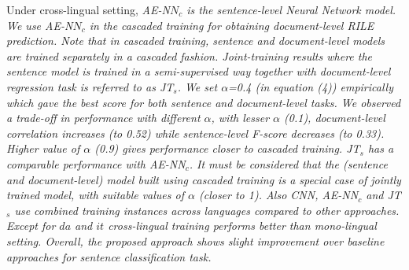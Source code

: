\documentclass[11pt,a4paper]{article}
\begin{document}
Under cross-lingual setting, \em{AE-N$N_{c}$} \rm is the sentence-level Neural Network model. We use \em{AE-N$N_{c}$} \rm in the \textit{cascaded training} for obtaining document-level RILE prediction. Note that in \textit{cascaded training}, sentence and document-level models are trained separately in a cascaded fashion. Joint-training results where the sentence model is trained in a semi-supervised way together with document-level regression task is referred to as \em{JT$_{s}$}\rm. We set  $\alpha$=0.4 (in equation (4)) empirically which gave the best score for both sentence and document-level tasks. We observed a trade-off in performance with different $\alpha$, with lesser $\alpha$ (0.1), document-level correlation increases (to 0.52) while sentence-level F-score decreases (to 0.33). Higher value of $\alpha$ (0.9) gives performance closer to cascaded training. \em{JT$_{s}$} \rm has a comparable performance with \em{AE-NN$_{c}$}. \rm It must be considered that the (sentence and document-level) model built using cascaded training is a special case of jointly trained model, with suitable values of $\alpha$ (closer to 1). Also \em{CNN}, \em{AE-NN}$_{c}$ and \em{JT}$_{s}$ \rm use combined training instances across languages compared to other approaches. Except for $da$ and $it$ cross-lingual training performs better than mono-lingual setting. Overall, the proposed approach shows slight improvement over baseline approaches for sentence classification task.
\end{document}
